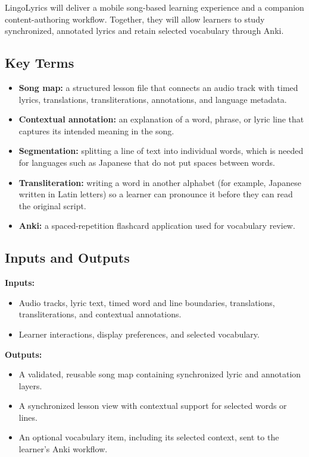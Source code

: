 \documentclass{article}
\begin{document}
LingoLyrics will deliver a mobile song-based learning experience and a companion
content-authoring workflow. Together, they will allow learners to study
synchronized, annotated lyrics and retain selected vocabulary through Anki.

\subsection{Key Terms}
\begin{itemize}
  \item \textbf{Song map:} a structured lesson file that connects an audio
        track with timed lyrics, translations, transliterations, annotations,
        and language metadata.
  \item \textbf{Contextual annotation:} an explanation of a word, phrase, or
        lyric line that captures its intended meaning in the song.
  \item \textbf{Segmentation:} splitting a line of text into individual words,
        which is needed for languages such as Japanese that do not put spaces
        between words.
  \item \textbf{Transliteration:} writing a word in another alphabet (for
        example, Japanese written in Latin letters) so a learner can
        pronounce it before they can read the original script.    
  \item \textbf{Anki:} a spaced-repetition flashcard application used for
        vocabulary review.
\end{itemize}

\subsection{Inputs and Outputs}
\textbf{Inputs:}
\begin{itemize}
  \item Audio tracks, lyric text, timed word and line boundaries, translations,
        transliterations, and contextual annotations.
  \item Learner interactions, display preferences, and selected vocabulary.
\end{itemize}

\textbf{Outputs:}
\begin{itemize}
  \item A validated, reusable song map containing synchronized lyric and
        annotation layers.
  \item A synchronized lesson view with contextual support for selected words
        or lines.
  \item An optional vocabulary item, including its selected context, sent to
        the learner's Anki workflow.
\end{itemize}
\end{document}
